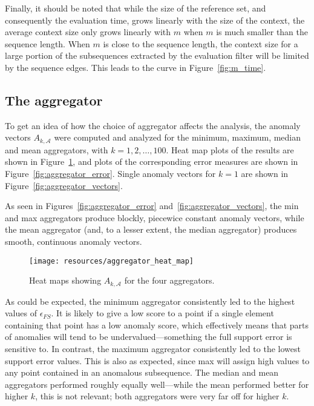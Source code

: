 Finally, it should be noted that while the size of the reference set, and consequently the evaluation time, grows linearly with the size of the context, the average context size only grows linearly with $m$ when $m$ is much smaller than the sequence length. When $m$ is close to the sequence length, the context size for a large portion of the subsequences extracted by the evaluation filter will be limited by the sequence edges. This leads to the curve in Figure~\ref{fig:m_time}.

\clearpage

\subsection{The aggregator}
\FloatBarrier{}
\label{sect:A}

To get an idea of how the choice of aggregator affects the analysis, the anomaly vectors $A_{k, \mathcal{A}}$ were computed and analyzed for the minimum, maximum, median and mean aggregators, with $k = 1,2,\dots,100$. Heat map plots of the results are shown in Figure~\ref{fig:aggregator_heat_map}, and plots of the corresponding error measures are shown in Figure~\ref{fig:aggregator_error}. Single anomaly vectors for $k=1$ are shown in Figure~\ref{fig:aggregator_vectors}.

As seen in Figures~\ref{fig:aggregator_error} and~\ref{fig:aggregator_vectors}, the min and max aggregators produce blockly, piecewice constant anomaly vectors, while the mean aggregator (and, to a lesser extent, the median aggregator) produces smooth, continuous anomaly vectors.

\begin{figure}[!ht]
    \vspace{-20pt}
    \begin{center}
        \texttt{[image: resources/aggregator\_heat\_map]}
    \end{center}
    \vspace{-10pt}
    \caption{\small{Heat maps showing $A_{k, \mathcal{A}}$ for the four aggregators.}}
\label{fig:aggregator_heat_map}
    \vspace{-15pt}
\end{figure}

As could be expected, the minimum aggregator consistently led to the highest values of $\epsilon_{FS}$. It is likely to give a low score to a point if a single element containing that point has a low anomaly score, which effectively means that parts of anomalies will tend to be undervalued---something the full support error is sensitive to. In contrast, the maximum aggregator consistently led to the lowest support error values. This is also as expected, since max will assign high values to any point contained in an anomalous subsequence. The median and mean aggregators performed roughly equally well---while the mean performed better for higher $k$, this is not relevant; both aggregators were very far off for higher $k$.

